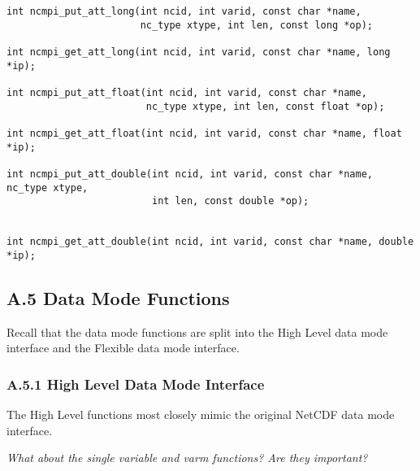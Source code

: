 \documentclass[10pt]{article}
\begin{document}
\begin{verbatim}
int ncmpi_put_att_long(int ncid, int varid, const char *name,
                       nc_type xtype, int len, const long *op);

int ncmpi_get_att_long(int ncid, int varid, const char *name, long *ip);

int ncmpi_put_att_float(int ncid, int varid, const char *name,
                        nc_type xtype, int len, const float *op);

int ncmpi_get_att_float(int ncid, int varid, const char *name, float *ip);

int ncmpi_put_att_double(int ncid, int varid, const char *name, nc_type xtype,
                         int len, const double *op);


int ncmpi_get_att_double(int ncid, int varid, const char *name, double *ip);
\end{verbatim}
%
%
\subsection*{A.5  Data Mode Functions}

Recall that the data mode functions are split into the High Level data mode interface and the
Flexible data mode interface.

\subsubsection*{A.5.1  High Level Data Mode Interface}

The High Level functions most closely mimic the original NetCDF data mode interface.

\emph{What about the single variable and varm functions?  Are they important?}
\end{document}
